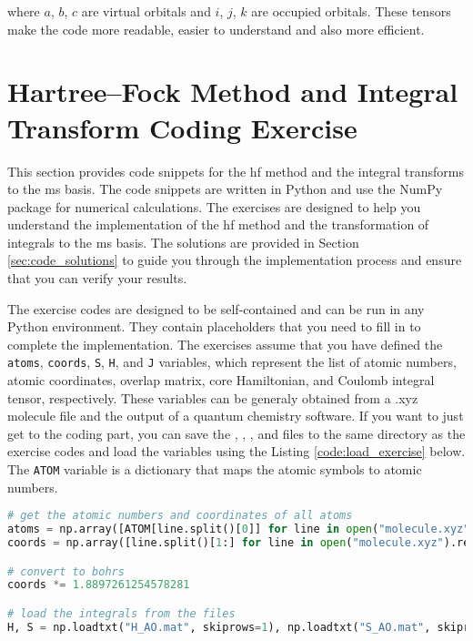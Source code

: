 where \(a\), \(b\), \(c\) are virtual orbitals and \(i\), \(j\), \(k\) are occupied orbitals. These tensors make the code more readable, easier to understand and also more efficient.

\section{\texorpdfstring{Hartree--Fock Method and Integral Transform Coding Exercise\label{sec:hf_int_code_exercise}}{Hartree--Fock Method and Integral Transform Coding Exercise}}

This section provides code snippets for the \acrshort{hf} method and the integral transforms to the \acrshort{ms} basis. The code snippets are written in Python and use the NumPy package for numerical calculations. The exercises are designed to help you understand the implementation of the \acrshort{hf} method and the transformation of integrals to the \acrshort{ms} basis. The solutions are provided in Section \ref{sec:code_solutions} to guide you through the implementation process and ensure that you can verify your results.

The exercise codes are designed to be self-contained and can be run in any Python environment. They contain placeholders that you need to fill in to complete the implementation. The exercises assume that you have defined the \texttt{\lstinline!atoms!}, \texttt{\lstinline!coords!}, \texttt{\lstinline!S!}, \texttt{\lstinline!H!}, and \texttt{\lstinline!J!} variables, which represent the list of atomic numbers, atomic coordinates, overlap matrix, core Hamiltonian, and Coulomb integral tensor, respectively. These variables can be generaly obtained from a .xyz molecule file and the output of a quantum chemistry software. If you want to just get to the coding part, you can save the , , , and  files to the same directory as the exercise codes and load the variables using the Listing \ref{code:load_exercise} below. The \texttt{\lstinline!ATOM!} variable is a dictionary that maps the atomic symbols to atomic numbers.

\raggedbottom\begin{lstlisting}[language=Python, caption={Example loading of molecule and integrals over atomic basis functions into variables used throughout exercises.}, label=code:load_exercise]
# get the atomic numbers and coordinates of all atoms
atoms = np.array([ATOM[line.split()[0]] for line in open("molecule.xyz").readlines()[2:]], dtype=int)
coords = np.array([line.split()[1:] for line in open("molecule.xyz").readlines()[2:]], dtype=float)

# convert to bohrs
coords *= 1.8897261254578281

# load the integrals from the files
H, S = np.loadtxt("H_AO.mat", skiprows=1), np.loadtxt("S_AO.mat", skiprows=1); J = np.loadtxt("J_AO.mat", skiprows=1).reshape(4 * [S.shape[1]])
\end{lstlisting}

